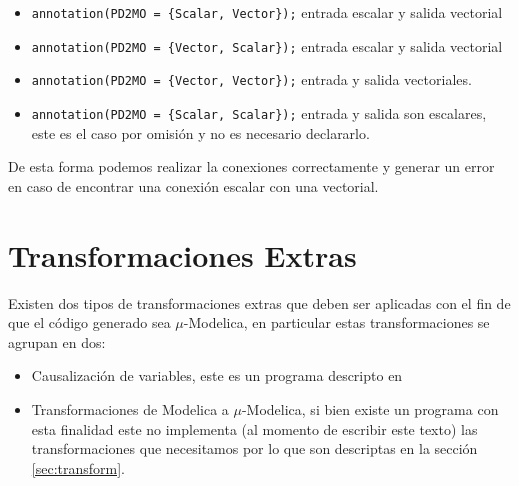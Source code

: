 \begin{itemize}
	\item \texttt{annotation(PD2MO = \{Scalar, Vector\});} entrada escalar y salida vectorial
	\item \texttt{annotation(PD2MO = \{Vector, Scalar\});} entrada escalar y salida vectorial
	\item \texttt{annotation(PD2MO = \{Vector, Vector\});} entrada y salida vectoriales.
	\item \texttt{annotation(PD2MO = \{Scalar, Scalar\});} entrada y salida son escalares, este es el caso por omisión y no es necesario declararlo.
\end{itemize}

	De esta forma podemos realizar la conexiones correctamente y generar un error en caso de encontrar una conexión escalar con una vectorial. 

\section{Transformaciones Extras}
	
	Existen dos tipos de transformaciones extras que deben ser aplicadas con el fin de que el código generado sea $\mu$-Modelica, en particular 
	estas transformaciones se agrupan en dos:
	\begin{itemize}
	\item Causalización de variables, este es un programa descripto en \cite{Mod15}
	\item Transformaciones de Modelica a $\mu$-Modelica, si bien existe un programa con esta finalidad este no implementa (al momento de escribir este texto)
	las transformaciones que necesitamos por lo que son descriptas en la sección \ref{sec:transform}.
	\end{itemize}
